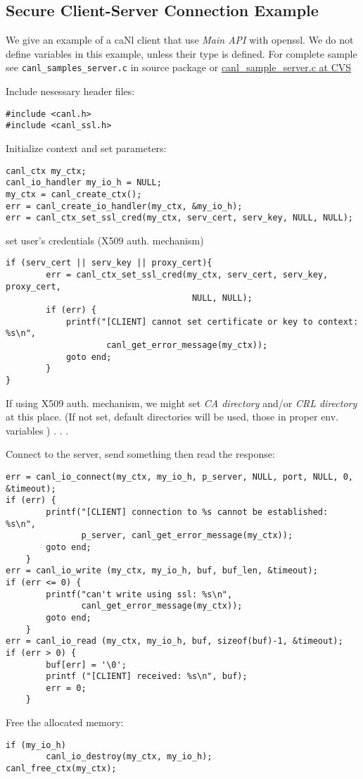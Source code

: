\subsection{Secure Client-Server Connection Example}
We give an example of a caNl client that use \textit{Main API} 
with openssl. We do not define variables in this example, unless
their type is \CANL defined. For complete sample see 
{\tt canl\_samples\_server.c} in source package or \href{http://glite.cvs.cern.ch/cgi-bin/glite.cgi/emi.canl.canl-c/examples/canl\_sample\_server.c?revision=HEAD}{canl\_sample\_server.c at CVS}

Include nesessary header files:
\begin{lstlisting}
#include <canl.h>
#include <canl_ssl.h>
\end{lstlisting}

Initialize context and set parameters:
\begin{lstlisting}
canl_ctx my_ctx;
canl_io_handler my_io_h = NULL;
my_ctx = canl_create_ctx();
err = canl_create_io_handler(my_ctx, &my_io_h);
err = canl_ctx_set_ssl_cred(my_ctx, serv_cert, serv_key, NULL, NULL);
\end{lstlisting}

set user's credentials (X509 auth. mechanism)
\begin{lstlisting}
if (serv_cert || serv_key || proxy_cert){
        err = canl_ctx_set_ssl_cred(my_ctx, serv_cert, serv_key, proxy_cert,
                                     NULL, NULL);
        if (err) {
            printf("[CLIENT] cannot set certificate or key to context: %s\n",
                    canl_get_error_message(my_ctx));
            goto end;
        }
}
\end{lstlisting}

If using X509 auth. mechanism, we might set \textit{CA directory} and/or
 \textit{CRL directory} at this place. (If not set, default directories
will be used, \ie those in proper env. variables )
.
.
.

Connect to the server, send something then read the response:

\begin{lstlisting}
err = canl_io_connect(my_ctx, my_io_h, p_server, NULL, port, NULL, 0, &timeout);
if (err) {
        printf("[CLIENT] connection to %s cannot be established: %s\n",
               p_server, canl_get_error_message(my_ctx));
        goto end;
    }
err = canl_io_write (my_ctx, my_io_h, buf, buf_len, &timeout);
if (err <= 0) {
        printf("can't write using ssl: %s\n",
               canl_get_error_message(my_ctx));
        goto end;
    }
err = canl_io_read (my_ctx, my_io_h, buf, sizeof(buf)-1, &timeout);
if (err > 0) {
        buf[err] = '\0';
        printf ("[CLIENT] received: %s\n", buf);
        err = 0;
    }
\end{lstlisting}

Free the allocated memory:

\begin{lstlisting}
if (my_io_h)
        canl_io_destroy(my_ctx, my_io_h);
canl_free_ctx(my_ctx);
\end{lstlisting}

